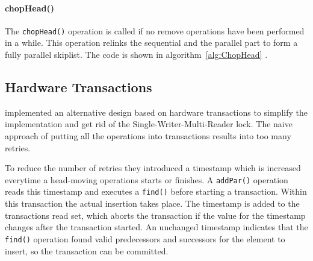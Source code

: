 \paragraph{chopHead()}

The \texttt{chopHead()} operation is called if no remove operations have been performed in a while. This operation relinks the sequential and the parallel part to form a fully parallel skiplist. The code is shown in algorithm~\ref{alg:ChopHead} \cite{calciu_adaptive_2014}.

\subsection{Hardware Transactions}

\citeauthor{calciu_adaptive_2014} implemented an alternative design based on hardware transactions to simplify the implementation and get rid of the Single-Writer-Multi-Reader lock. The naive approach of putting all the operations into transactions results into too many retries. 

To reduce the number of retries they introduced a timestamp which is increased everytime a head-moving operations starts or finishes. A \texttt{addPar()} operation reads this timestamp and executes a \texttt{find()} before starting a transaction. Within this transaction the actual insertion takes place. The timestamp is added to the transactions read set, which aborts the transaction if the value for the timestamp changes after the transaction started. An unchanged timestamp indicates that the \texttt{find()} operation found valid predecessors and successors for the element to insert, so the transaction can be committed. 